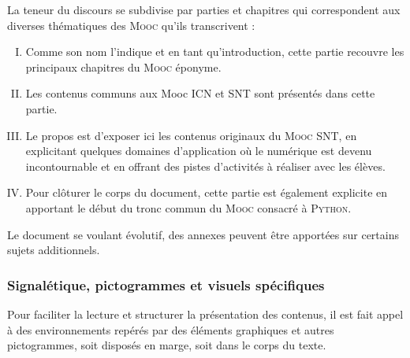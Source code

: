 La teneur du discours se subdivise par parties et chapitres qui correspondent aux diverses thématiques des \textsc{Mooc} qu'ils transcrivent :
\begin{enumerate}[I.]
\item {} Comme son nom l'indique et en tant qu'introduction, cette partie recouvre les principaux chapitres du \textsc{Mooc} éponyme.
\item {} Les contenus communs aux Mooc ICN et SNT sont présentés dans cette partie.
\item {}  Le propos est d'exposer ici les contenus originaux du \textsc{Mooc} SNT, en explicitant quelques domaines d'application où le numérique est devenu incontournable et en offrant des pistes d'activités à réaliser avec les élèves.
\item {} Pour clôturer le corps du document, cette partie est également explicite en apportant le début du tronc commun du \textsc{Mooc} consacré à \textsc{Python}.
\end{enumerate}
Le document se voulant évolutif, des annexes peuvent être apportées sur certains sujets additionnels.



\subsubsection*{Signalétique, pictogrammes et visuels spécifiques}

Pour faciliter la lecture et structurer la présentation des contenus, il est fait appel à des environnements repérés par des éléments graphiques et autres pictogrammes, soit disposés en marge, soit dans le corps du texte.

